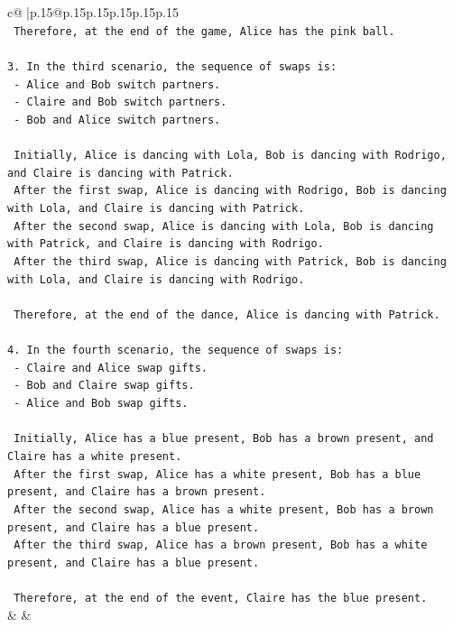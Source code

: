 \documentclass{article}
\begin{document}
{\begin{supertabular}{c@{$\;$}|p{.15\linewidth}@{}p{.15\linewidth}p{.15\linewidth}p{.15\linewidth}p{.15\linewidth}p{.15\linewidth}}
{{{\\ 
\texttt{   Therefore, at the end of the game, Alice has the pink ball.} \\
\\ 
\texttt{3. In the third scenario, the sequence of swaps is:} \\
\texttt{   {-} Alice and Bob switch partners.} \\
\texttt{   {-} Claire and Bob switch partners.} \\
\texttt{   {-} Bob and Alice switch partners.} \\
\\ 
\texttt{   Initially, Alice is dancing with Lola, Bob is dancing with Rodrigo, and Claire is dancing with Patrick.} \\
\texttt{   After the first swap, Alice is dancing with Rodrigo, Bob is dancing with Lola, and Claire is dancing with Patrick.} \\
\texttt{   After the second swap, Alice is dancing with Lola, Bob is dancing with Patrick, and Claire is dancing with Rodrigo.} \\
\texttt{   After the third swap, Alice is dancing with Patrick, Bob is dancing with Lola, and Claire is dancing with Rodrigo.} \\
\\ 
\texttt{   Therefore, at the end of the dance, Alice is dancing with Patrick.} \\
\\ 
\texttt{4. In the fourth scenario, the sequence of swaps is:} \\
\texttt{   {-} Claire and Alice swap gifts.} \\
\texttt{   {-} Bob and Claire swap gifts.} \\
\texttt{   {-} Alice and Bob swap gifts.} \\
\\ 
\texttt{   Initially, Alice has a blue present, Bob has a brown present, and Claire has a white present.} \\
\texttt{   After the first swap, Alice has a white present, Bob has a blue present, and Claire has a brown present.} \\
\texttt{   After the second swap, Alice has a white present, Bob has a brown present, and Claire has a blue present.} \\
\texttt{   After the third swap, Alice has a brown present, Bob has a white present, and Claire has a blue present.} \\
\\ 
\texttt{   Therefore, at the end of the event, Claire has the blue present.} \\
            }
        }
    }
    & & \\ \\


\end{supertabular}}
\end{document}
